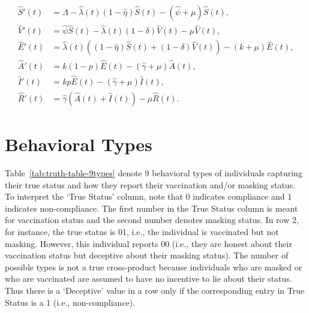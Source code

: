 \documentclass[sigconf,review]{acmart}
\begin{document}
\begin{align}
\hat{S}'(t) &= \Lambda - \hat{\lambda}(t) (1 - \hat{\eta}) \hat{S}(t) - (\hat{\psi} + \mu) \hat{S}(t), \nonumber \\
\hat{V}'(t) &= \hat{\psi} \hat{S}(t) - \hat{\lambda}(t) (1 - \delta) \hat{V}(t) - \mu \hat{V}(t), \nonumber \\
\hat{E}'(t) &= \hat{\lambda}(t) \left((1 - \hat{\eta}) \hat{S}(t) + (1 - \delta) \hat{V}(t)\right) - (k + \mu) \hat{E}(t), \nonumber \\
\hat{A}'(t) &= k(1 - p) \hat{E}(t) - (\hat{\gamma} + \mu) \hat{A}(t), \nonumber \\
\hat{I}'(t) &= kp \hat{E}(t) - (\hat{\gamma} + \mu) \hat{I}(t), \nonumber \\
\hat{R}'(t) &= \hat{\gamma} (\hat{A}(t) + \hat{I}(t)) - \mu \hat{R}(t).
\label{eq_ODE_est}
\end{align}



\section{Behavioral Types}
Table~\ref{tab:truth-table-9types}
denote 9 behavioral types of individuals capturing their true status and how they report their vaccination and/or masking status. To interpret the `True Status' column, note that 0 indicates compliance and 1 indicates non-compliance. The first number in the True Status column is meant for vaccination status and the second number denotes masking status. 
In row 2, for instance, the true status is 01, i.e., the individual is vaccinated but not masking.
However, this individual reports 00 (i.e., they are honest about their vaccination status but deceptive about their masking status). The number of possible types is not a true cross-product because individuals who are masked or who are vaccinated are assumed to have no incentive to lie about their status. Thus there is a `Deceptive' value in a row only if the corresponding entry in True Status is a 1 (i.e., non-compliance).
\end{document}
